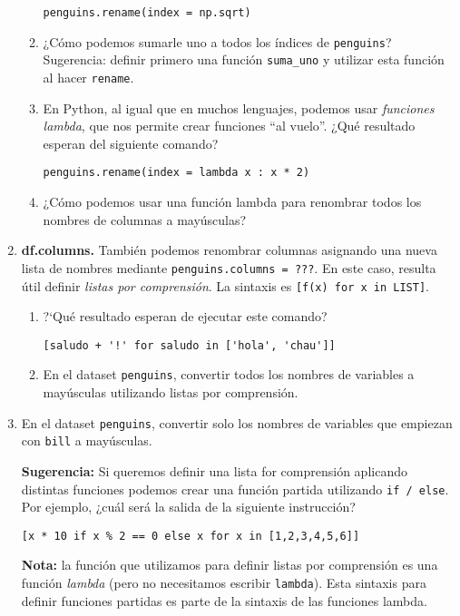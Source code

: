 \documentclass[a4paper,11pt]{article}
\theoremstyle{definition}
\begin{document}
\begin{enumerate}
\begin{enumerate}
\lstinline{penguins.rename(index = np.sqrt)}

\item ¿Cómo podemos sumarle uno a todos los índices de \lstinline{penguins}? Sugerencia: definir primero una función \lstinline{suma_uno} y utilizar esta función al hacer \lstinline{rename}.

\item En Python, al igual que en muchos lenguajes, podemos usar \emph{funciones lambda}, que nos permite crear funciones ``al vuelo''.
¿Qué resultado esperan del siguiente comando?

\lstinline{penguins.rename(index = lambda x : x * 2)}

\item ¿Cómo podemos usar una función lambda para renombrar todos los nombres de columnas a mayúsculas?
\end{enumerate}

\item \label{ej:comprehension} \textbf{df.columns.} También podemos renombrar columnas asignando una nueva lista de nombres mediante \lstinline{penguins.columns = ???}. En este caso, resulta útil definir \emph{listas por comprensión}. La sintaxis es \lstinline{[f(x) for x in LIST]}.

\begin{enumerate}
\item ?`Qué resultado esperan de ejecutar este comando?

\lstinline{[saludo + '!' for saludo in ['hola', 'chau']]}

\item En el dataset \lstinline{penguins}, convertir todos los nombres de variables a mayúsculas utilizando listas por comprensión.
\end{enumerate}

\item En el dataset \lstinline{penguins}, convertir solo los nombres de variables que empiezan con \lstinline{bill} a mayúsculas.

\textbf{Sugerencia:} Si queremos definir una lista for comprensión aplicando distintas funciones podemos crear una función partida utilizando \lstinline{if / else}. Por ejemplo, ¿cuál será la salida de la siguiente instrucción?

\lstinline{[x * 10 if x % 2 == 0 else x for x in [1,2,3,4,5,6]]}

\textbf{Nota:} la función que utilizamos para definir listas por comprensión es una función \emph{lambda} (pero no necesitamos escribir \lstinline{lambda}). Esta sintaxis para definir funciones partidas es parte de la sintaxis de las funciones lambda.


\end{enumerate}
\end{document}
